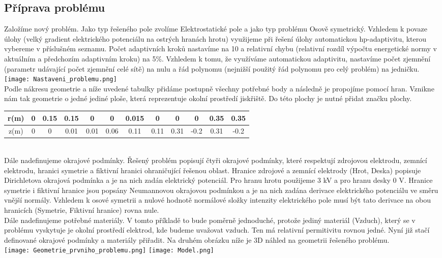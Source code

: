 \documentclass[a4paper, oneside]{article}
\begin{document}
\subsection{Příprava problému}
\indent Založíme nový problém. Jako typ řešeného pole zvolíme Elektrostatické pole a jako typ problému Osově symetrický. Vzhledem k povaze úlohy (velký gradient elektrického potenciálu na ostrých hranách hrotu) využijeme při řešení úlohy automatickou hp-adaptivitu, kterou vybereme v příslušném seznamu. Počet adaptivních kroků nastavíme na 10 a relativní chybu (relativní rozdíl výpočtu energetické normy v aktuálním a předchozím adaptivním kroku) na 5\%. Vzhledem k tomu, že využíváme automatickou adaptivitu, nastavíme počet zjemnění (parametr udávající počet zjemnění celé sítě) na nulu a řád polynomu (nejnižší použitý řád polynomu pro celý problém) na jedničku.\\
\texttt{[image: Nastaveni\_problemu.png]}\\
\indent Podle nákresu geometrie a níže uvedené tabulky přidáme postupně všechny potřebné body a následně je propojíme pomocí hran. Vznikne nám tak geometrie o jedné jediné ploše, která reprezentuje okolní prostředí jiskřiště. Do této plochy je nutné přidat značku plochy.\\
\begin{tabular}{|c|c|c|c|c|c|c|c|c|c|c|c|}
\hline
r(m) & 0 & 0.15 & 0.15 & 0 & 0 & 0.015 & 0 & 0 & 0 & 0.35 & 0.35\\
\hline
z(m) & 0 & 0 & 0.01 & 0.01 & 0.06 & 0.11 & 0.11 & 0.31 & -0.2 & 0.31 & -0.2\\
\hline 
\end{tabular} \\
\indent Dále nadefinujeme okrajové podmínky. Řešený problém popisují čtyři okrajové podmínky, které respektují zdrojovou elektrodu, zemnící elektrodu, hranici symetrie a fiktivní hranici ohraničující řešenou oblast. Hranice zdrojové a zemnící elektrody (Hrot, Deska) popisuje Dirichletova okrajová podmínka a je na nich zadán elektrický potenciál. Pro hranu hrotu použijeme 3 kV a pro hranu desky 0 V. Hranice symetrie i fiktivní hranice jsou popsány Neumannovou okrajovou podmínkou a je na nich zadána derivace elektrického potenciálu ve směru vnější normály. Vzhledem k osové symetrii a nulové hodnotě normálové složky intenzity elektrického pole musí být tato derivace na obou hranicích (Symetrie, Fiktivní hranice) rovna nule.\\
\indent Dále nadefinujeme potřebné materiály. V tomto příkladě to bude poměrně jednoduché, protože jediný materiál (Vzduch), který se v problému vyskytuje je okolní prostředí elektrod, kde budeme uvažovat vzduch. Ten má relativní permitivitu rovnou jedné. Nyní již stačí definované okrajové podmínky a materiály přiřadit. Na druhém obrázku níže je 3D náhled na geometrii řešeného problému.\\
\texttt{[image: Geometrie\_prvniho\_problemu.png]}
\texttt{[image: Model.png]}\\
\end{document}
